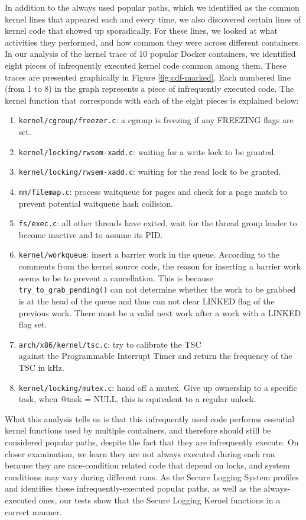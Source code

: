 In addition to the always used popular paths, which we identified as the common kernel lines that appeared each and every time, 
we also discovered certain lines of kernel code that showed up sporadically. 
For these lines, we looked at what activities they performed, and how common they were across different containers. 
In our analysis of the kernel trace of 10 popular Docker containers, we identified eight pieces of infrequently executed kernel code common among them. 
These traces are presented graphically in Figure \ref{fig:cdf-marked}. 
Each numbered line (from 1 to 8) in the graph represents a piece of infrequently executed code. 
The kernel function that corresponds with each of the eight pieces is explained below: 
\begin{enumerate}
	\item \verb|kernel/cgroup/freezer.c|: a cgroup is freezing if any FREEZING flags are set.
	\item \verb|kernel/locking/rwsem-xadd.c|: waiting for a write lock to be granted. 
	\item \verb|kernel/locking/rwsem-xadd.c|: waiting for the read lock to be granted.
	\item \verb|mm/filemap.c|: process waitqueue for pages and check for a page match to prevent potential waitqueue hash collision. 
	\item \verb|fs/exec.c|: all other threads have exited, wait for the thread group leader to become inactive and to assume its PID. 
	\item \verb|kernel/workqueue|: insert a barrier work in the queue. According to the comments from the kernel source code, 
	the reason for inserting a barrier work seems to be to prevent a cancellation. 
	This is because \\
	\verb|try_to_grab_pending()| can not determine whether the work to be grabbed is at the head of the queue and thus can not clear LINKED flag of the previous work. 
	There must be a valid next work after a work with a LINKED flag set. 
	\item \verb|arch/x86/kernel/tsc.c|: try to calibrate the TSC \\ 
	against the Programmable Interrupt Timer and return the frequency of the TSC in kHz. 
	\item \verb|kernel/locking/mutex.c|: hand off a mutex. Give up ownership to a specific task, when @task = NULL, this is equivalent to a regular unlock.
\end{enumerate}

What this analysis tells us is that this infrequently used code performs essential kernel functions used by multiple containers, and therefore should still be considered popular paths, 
despite the fact that they are infrequently execute. 
On closer examination, we learn they are not always executed during each run because they are race-condition related code that depend on locks, and system conditions may vary during different runs. 
As the Secure Logging System profiles and identifies these infrequently-executed popular paths, as well as the always-executed ones, 
our tests show that the Secure Logging Kernel functions in a correct manner.

